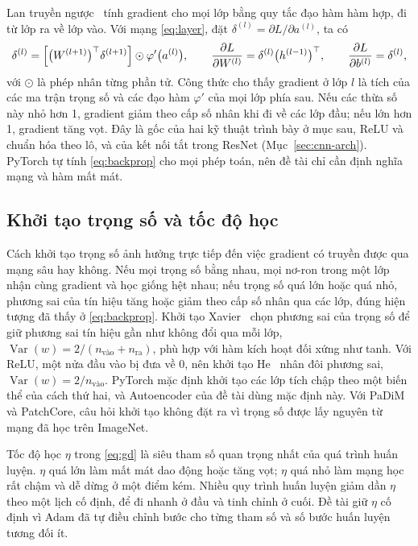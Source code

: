Lan truyền ngược~\cite{rumelhartLearningRepresentationsBackpropagating1986} tính gradient cho mọi lớp bằng quy tắc
đạo hàm hàm hợp, đi từ lớp ra về lớp vào. Với mạng \eqref{eq:layer}, đặt $\delta^{(l)} = \partial L / \partial
a^{(l)}$, ta có
\begin{equation}
  \delta^{(l)} = \Bigl[\bigl(W^{(l+1)}\bigr)^{\top} \delta^{(l+1)}\Bigr] \odot \varphi'\bigl(a^{(l)}\bigr), \qquad
  \frac{\partial L}{\partial W^{(l)}} = \delta^{(l)} \bigl(h^{(l-1)}\bigr)^{\top}, \qquad
  \frac{\partial L}{\partial b^{(l)}} = \delta^{(l)} ,
  \label{eq:backprop}
\end{equation}
với $\odot$ là phép nhân từng phần tử. Công thức cho thấy gradient ở lớp $l$ là tích của các ma trận trọng số và các
đạo hàm $\varphi'$ của mọi lớp phía sau. Nếu các thừa số này nhỏ hơn 1, gradient giảm theo cấp số nhân khi đi về các
lớp đầu; nếu lớn hơn 1, gradient tăng vọt. Đây là gốc của hai kỹ thuật trình bày ở mục sau, ReLU và chuẩn hóa theo
lô, và của kết nối tắt trong ResNet (Mục~\ref{sec:cnn-arch}). PyTorch tự tính \eqref{eq:backprop} cho mọi phép toán,
nên đề tài chỉ cần định nghĩa mạng và hàm mất mát.

\subsection{Khởi tạo trọng số và tốc độ học}

Cách khởi tạo trọng số ảnh hưởng trực tiếp đến việc gradient có truyền được qua mạng sâu hay không. Nếu mọi trọng số
bằng nhau, mọi nơ-ron trong một lớp nhận cùng gradient và học giống hệt nhau; nếu trọng số quá lớn hoặc quá nhỏ,
phương sai của tín hiệu tăng hoặc giảm theo cấp số nhân qua các lớp, đúng hiện tượng đã thấy ở \eqref{eq:backprop}.
Khởi tạo Xavier~\cite{glorotUnderstandingDifficultyTraining2010} chọn phương sai của trọng số để giữ phương sai tín
hiệu gần như không đổi qua mỗi lớp, $\operatorname{Var}(w) = 2/(n_{\text{vào}} + n_{\text{ra}})$, phù hợp với hàm
kích hoạt đối xứng như tanh. Với ReLU, một nửa đầu vào bị đưa về 0, nên khởi tạo
He~\cite{heDelvingDeepRectifiers2015} nhân đôi phương sai, $\operatorname{Var}(w) = 2/n_{\text{vào}}$. PyTorch mặc
định khởi tạo các lớp tích chập theo một biến thể của cách thứ hai, và Autoencoder của đề tài dùng mặc định này. Với
PaDiM và PatchCore, câu hỏi khởi tạo không đặt ra vì trọng số được lấy nguyên từ mạng đã học trên ImageNet.

Tốc độ học $\eta$ trong \eqref{eq:gd} là siêu tham số quan trọng nhất của quá trình huấn luyện. $\eta$ quá lớn làm
mất mát dao động hoặc tăng vọt; $\eta$ quá nhỏ làm mạng học rất chậm và dễ dừng ở một điểm kém. Nhiều quy trình huấn
luyện giảm dần $\eta$ theo một lịch cố định, để đi nhanh ở đầu và tinh chỉnh ở cuối. Đề tài giữ $\eta$ cố định vì
Adam đã tự điều chỉnh bước cho từng tham số và số bước huấn luyện tương đối ít.

